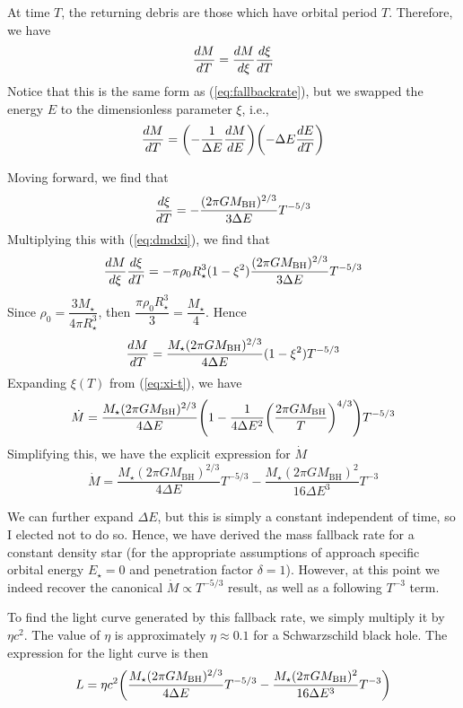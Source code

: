 \documentclass[10pt,a4paper]{article}
\newcommand{\mbh}{M_\text{BH}}
\begin{document}
		At time $T$, the returning debris are those which have orbital period $T$. Therefore, we have
		\begin{equation}
			\label{eq:massfallbackxi}
			\dv{M}{T} = \dv{M}{\xi} \dv{\xi}{T}   
		\end{equation}
		Notice that this is the same form as (\ref{eq:fallbackrate}), but we swapped the energy $E$ to the dimensionless parameter $\xi$, i.e.,
		\[
			\dv{M}{T} = {
				\pqty{
					- \frac{1}{\Delta E} \dv{M}{E} 
				}
				\pqty{
					-\Delta E \dv{E}{T} 
				}
			} 
		\]
		
		Moving forward, we find that
		\begin{equation}
			\label{eq:dxidt}
			\dv{\xi}{T} 
			=
			-\frac{(2\pi G\mbh)^{2/3}}{3\Delta E} T^{-5/3} 
		\end{equation}
		Multiplying this with (\ref{eq:dmdxi}), we find that
		\begin{equation}
			\label{eq:dmdt}
			\dv{M}{\xi} \dv{\xi}{T}   
			= 
			-\pi\rho_0 R_\star^3 (1- \xi^2)  
			\frac{(2\pi G\mbh)^{2/3}}{3\Delta E} T^{-5/3} 
		\end{equation}
		Since $\rho_0 =\dfrac{3M_\star}{4\pi R_\star^3}$, then $\dfrac{\pi \rho_0 R_\star^3}{3} = \dfrac{M_\star}{4}$. Hence
		\[
			\dv{M}{T} = 
			\frac{M_\star (2\pi G\mbh)^{2/3}}{4\Delta E}
			(1-\xi^2) T^{-5/3}
		\]
		Expanding $\xi(T)$ from (\ref{eq:xi-t}), we have
		\[
			\dot{M} =  
			\frac{M_\star (2\pi G\mbh)^{2/3}}{4\Delta E}
			\pqty{1-
				\frac{1}{4\Delta E^2} \pqty{
					\frac{2\pi G\mbh}{T} 
				}^{4/3}
			}
			T^{-5/3}
		\]
		Simplifying this, we have the explicit expression for $\dot{M}$
		\begin{equation}
			\label{eq:mdot}
			\dot{M} 
			= 
			\frac{
				M_\star (2\pi G \mbh)^{2/3}
			}{4\Delta E} T^{-5/3}
			-
			\frac{
				M_\star (2\pi G \mbh)^2
			}{16 \Delta E^3} T^{-3}
		\end{equation}
		
		We can further expand $\Delta E$, but this is simply a constant independent of time, so I elected not to do so.
		Hence, we have derived the mass fallback rate for a constant density star (for the appropriate assumptions of approach specific orbital energy $E_\star=0$ and penetration factor $\delta = 1$). 
		However, at this point we indeed recover the canonical $\dot M \propto T^{-5/3}$ result, as well as a following $T^{-3}$ term.

		To find the light curve generated
		by this fallback rate, we simply multiply it by $\eta c^2$. The value of $\eta$ is approximately $\eta\approx 0.1$ 
		for a Schwarzschild black hole\cite{Noble2011}. The expression for the light curve is then
		\begin{equation}
			\label{eq:light-curve}
			L
			=
			\eta c^2
			\pqty{
				\frac{
					M_\star (2\pi G \mbh)^{2/3}
				}{4\Delta E} T^{-5/3}
				-
				\frac{
					M_\star (2\pi G \mbh)^2
				}{16 \Delta E^3} T^{-3}
			}
		\end{equation}
\end{document}
